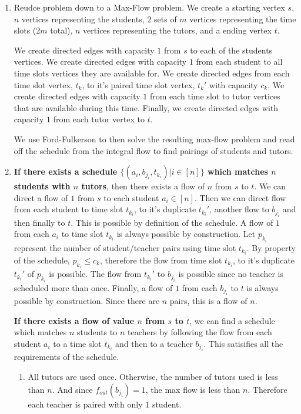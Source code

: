 \documentclass[12pt]{article}
\begin{document}
\begin{enumerate}
\item[(a)] Reudce problem down to a Max-Flow problem. We create a starting vertex $s$, $n$ vertices representing the students, $2$ sets of $m$ vertices representing the time slots ($2m$ total), $n$ vertices representing the tutors, and a ending vertex $t$. 

We create directed edges with capacity $1$ from $s$ to each of the students vertices. We create directed edges with capacity $1$ from each student to all time slots vertices they are available for. We create directed edges from each time slot vertex, $t_k$, to it's paired time slot vertex, $t_k'$ with capacity $c_k$. We create directed edges with capacity $1$ from each time slot to tutor vertices that are available during this time. Finally, we create directed edges with capacity $1$ from each tutor vertex to $t$.

We use Ford-Fulkerson to then solve the resulting max-flow problem and read off the schedule from the integral flow to find pairings of students and tutors.

\item[(b)] 
\textbf{If there exists a schedule $\{(a_i, b_{j_i}, t_{k_i}) | i \in [n]\}$ which matches $n$ students with $n$ tutors}, then there exists a flow of $n$ from $s$ to $t$. We can direct a flow of $1$ from $s$ to each student $a_i \in [n]$. Then we can direct flow from each student to time slot $t_{k_i}$, to it's duplicate $t_{k_i}'$, another flow to $b_{j_i}$ and then finally to $t$. 
This is possible by definition of the schedule. A flow of $1$ from each $a_i$ to time slot $t_{k_i}$ is always possible by construction. Let $p_{k_i}$ represent the number of student/teacher pairs using time slot $t_{k_i}$. By property of the schedule, $p_{k_i} \leq c_k$, therefore the flow from time slot $t_{k_i}$, to it's duplicate $t_{k_i}'$ of $p_{k_i}$ is possible. The flow from $t_{k_i}'$ to $b_{j_i}$ is possible since no teacher is scheduled more than once. Finally, a flow of $1$ from each $b_{j_i}$ to $t$ is always possible by construction. Since there are $n$ pairs, this is a flow of $n$.

\textbf{If there exists a flow of value $n$ from $s$ to $t$}, we can find a schedule which matches $n$ students to $n$ teachers by following the flow from each student $a_i$ to a time slot $t_{k_i}$ and then to a teacher $b_{j_i}$. This satisifies all the requirements of the schedule.
\begin{enumerate}
\item[] All tutors are used once. Otherwise, the number of tutors used is less than $n$. And since $f_{out}(b_{j_i}) = 1$, the max flow is less than $n$. Therefore each teacher is paired with only $1$ student.


\end{enumerate}
\end{enumerate}
\end{document}
